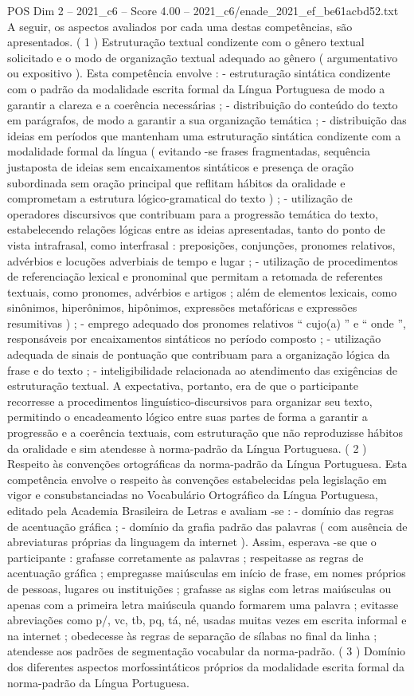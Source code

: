 \begin{textsample}{POS Dim 2 – 2021\_c6 – Score 4.00 – 2021\_c6/enade\_2021\_ef\_be61acbd52.txt}
A seguir, os aspectos avaliados por cada uma destas competências, são apresentados. ( 1 ) Estruturação textual condizente com o gênero textual solicitado e o modo de organização textual adequado ao gênero ( argumentativo ou expositivo ).
Esta competência envolve : - estruturação sintática condizente com o padrão da modalidade escrita formal da Língua Portuguesa de modo a garantir a clareza e a coerência necessárias ; - distribuição do conteúdo do texto em parágrafos, de modo a garantir a sua organização temática ; - distribuição das ideias em períodos que mantenham uma estruturação sintática condizente com a modalidade formal da língua ( evitando -se frases fragmentadas, sequência justaposta de ideias sem encaixamentos sintáticos e presença de oração subordinada sem oração principal que reflitam hábitos da oralidade e comprometam a estrutura lógico-gramatical do texto ) ; - utilização de operadores discursivos que contribuam para a progressão temática do texto, estabelecendo relações lógicas entre as ideias apresentadas, tanto do ponto de vista intrafrasal, como interfrasal : preposições, conjunções, pronomes relativos, advérbios e locuções adverbiais de tempo e lugar ; - utilização de procedimentos de referenciação lexical e pronominal que permitam a retomada de referentes textuais, como pronomes, advérbios e artigos ; além de elementos lexicais, como sinônimos, hiperônimos, hipônimos, expressões metafóricas e expressões resumitivas ) ; - emprego adequado dos pronomes relativos “ cujo(a) ” e “ onde ”, responsáveis por encaixamentos sintáticos no período composto ; - utilização adequada de sinais de pontuação que contribuam para a organização lógica da frase e do texto ; - inteligibilidade relacionada ao atendimento das exigências de estruturação textual.
A expectativa, portanto, era de que o participante recorresse a procedimentos linguístico-discursivos para organizar seu texto, permitindo o encadeamento lógico entre suas partes de forma a garantir a progressão e a coerência textuais, com estruturação que não reproduzisse hábitos da oralidade e sim atendesse à norma-padrão da Língua Portuguesa. ( 2 ) Respeito às convenções ortográficas da norma-padrão da Língua Portuguesa.
Esta competência envolve o respeito às convenções estabelecidas pela legislação em vigor e consubstanciadas no Vocabulário Ortográfico da Língua Portuguesa, editado pela Academia Brasileira de Letras e avaliam -se : - domínio das regras de acentuação gráfica ; - domínio da grafia padrão das palavras ( com ausência de abreviaturas próprias da linguagem da internet ).
Assim, esperava -se que o participante : grafasse corretamente as palavras ; respeitasse as regras de acentuação gráfica ; empregasse maiúsculas em início de frase, em nomes próprios de pessoas, lugares ou instituições ; grafasse as siglas com letras maiúsculas ou apenas com a primeira letra maiúscula quando formarem uma palavra ; evitasse abreviações como p/, vc, tb, pq, tá, né, usadas muitas vezes em escrita informal e na internet ; obedecesse às regras de separação de sílabas no final da linha ; atendesse aos padrões de segmentação vocabular da norma-padrão. ( 3 ) Domínio dos diferentes aspectos morfossintáticos próprios da modalidade escrita formal da norma-padrão da Língua Portuguesa.

\end{textsample}
